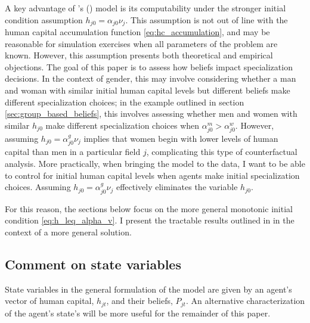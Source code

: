 \documentclass[11 pt]{article}
\newcommand{\citeposs}[1]{{\citeauthor{#1}'s (\citeyear{#1})}}
\begin{document}
A key advantage of \citeposs{AF20} model is its computability under the stronger initial condition assumption $h_{j0} = \alpha_{j0} \nu_j$.
This assumption is not out of line with the human capital accumulation function \eqref{eq:hc_accumulation}, and may be reasonable for simulation exercises when all parameters of the problem are known.
However, this assumption presents both theoretical and empirical objections.
The goal of this paper is to assess how beliefs impact specialization decisions.
In the context of gender, this may involve considering whether a man and woman with similar initial human capital levels but different beliefs make different specialization choices; in the example outlined in section \ref{sec:group_based_beliefs}, this involves assessing whether men and women with similar $h_{j0}$ make different specialization choices when $\alpha_{j0}^m > \alpha_{j0}^w$.
However, assuming $h_{j0} = \alpha_{j0}^g \nu_j$ implies that women begin with lower levels of human capital than men in a particular field $j$, complicating this type of counterfactual analysis.
More practically, when bringing the model to the data,  I want to be able to control for initial human capital levels when agents make initial specialization choices. 
Assuming $h_{j0} = \alpha_{j0}^g \nu_j$ effectively eliminates the variable $h_{j0}$.

For this reason, the sections below focus on the more general monotonic initial condition \eqref{eq:h_leq_alpha_v}.
I present the tractable results outlined in \textcite{AF20} in the context of a more general solution.

\subsection{Comment on state variables}\label{sec:comment_state_vars}

State variables in the general formulation of the model are given by an agent's vector of human capital, $h_{jt}$, and their beliefs, $P_{jt}$.
An alternative characterization of the agent's state's will be more useful for the remainder of this paper.
\end{document}
